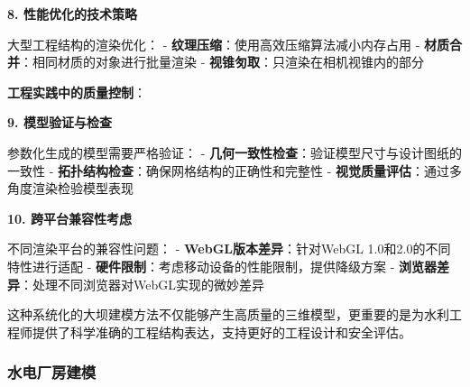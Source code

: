 \textbf{8. 性能优化的技术策略}

大型工程结构的渲染优化： - \textbf{纹理压缩}：使用高效压缩算法减小内存占用 - \textbf{材质合并}：相同材质的对象进行批量渲染 - \textbf{视锥匇取}：只渲染在相机视锥内的部分

\textbf{工程实践中的质量控制}：

\textbf{9. 模型验证与检查}

参数化生成的模型需要严格验证： - \textbf{几何一致性检查}：验证模型尺寸与设计图纸的一致性 - \textbf{拓扑结构检查}：确保网格结构的正确性和完整性 - \textbf{视觉质量评估}：通过多角度渲染检验模型表现

\textbf{10. 跨平台兼容性考虑}

不同渲染平台的兼容性问题： - \textbf{WebGL版本差异}：针对WebGL 1.0和2.0的不同特性进行适配 - \textbf{硬件限制}：考虑移动设备的性能限制，提供降级方案 - \textbf{浏览器差异}：处理不同浏览器对WebGL实现的微妙差异

这种系统化的大坝建模方法不仅能够产生高质量的三维模型，更重要的是为水利工程师提供了科学准确的工程结构表达，支持更好的工程设计和安全评估。

\subsubsection{水电厂房建模}\label{ux6c34ux7535ux5382ux623fux5efaux6a21}

